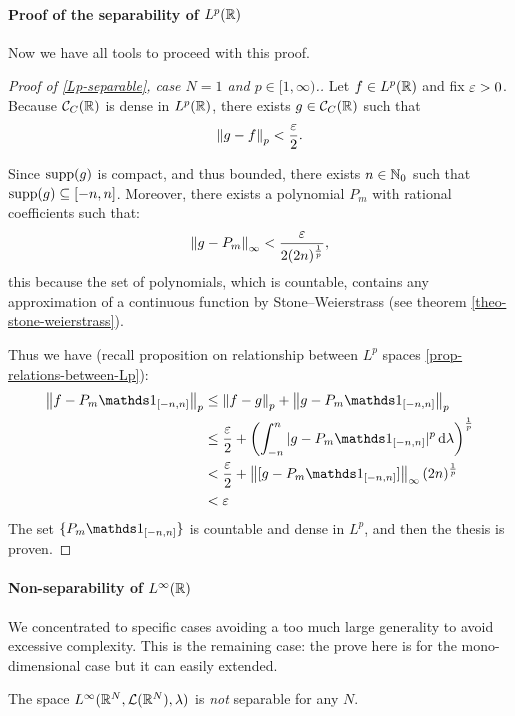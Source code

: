 \paragraph{Proof of the separability of $L^p(\mathbb R)$} Now we have all tools to proceed with this proof.
\begin{proof}[Proof of \vref{Lp-separable}, case $N=1$ and $p \in [1,\infty)$.]
	Let $f\in L^p(\mathbb R)$ and fix $\varepsilon >0$. Because $\mathcal C_C(\mathbb R)$ is dense in $L^p(\mathbb R)$, there exists $g \in \mathcal C_C(\mathbb R)$ such that $$\left\lVert g-f\right\rVert_p < \frac{\varepsilon}{2}.$$
	
	Since $\operatorname*{supp}(g)$ is compact, and thus bounded, there exists $n \in \mathbb N_0$ such that $\operatorname*{supp}(g) \subseteq [-n,n]$. Moreover, there exists a polynomial $P_m$ with rational coefficients such that:
	$$
		\left\lVert g-P_m\right\rVert_\infty 
		< \frac{\varepsilon}{2(2n)^{\frac 1 p}}
	,
	$$
	this because the set of polynomials, which is countable, contains any approximation of a continuous function by Stone--Weierstrass (see theorem \vref{theo-stone-weierstrass}).
	
	Thus we have (recall proposition on relationship between $L^p$ spaces \vref{prop-relations-between-Lp}):
	\begin{align*}
	\norm{f - P_m\Ind_{[-n,n]}}_p &\leq \norm{f-g}_p+\norm{g - P_m\Ind_{[-n,n]}}_p\\
	&\le \frac \eps 2 + \left( \int_{-n}^{n}| g - P_m\Ind_{[-n,n]}|^p \,\dlam \right)^\frac{1}{p}\\
	&< \frac \eps 2 + \norm{[g- P_m\Ind_{[-n,n]}]}_\infty(2n)^{\frac 1 p}\\
	&< \eps
	\end{align*}
	The set $\{P_m\Ind_{[-n,n]}\}$ is countable and dense in $L^p$, and then the thesis is proven.
\end{proof}

\paragraph{Non-separability of $L^\infty(\mathbb R)$} We concentrated to specific cases avoiding a too much large generality to avoid excessive complexity. This is the remaining case: the prove here is for the mono-dimensional case but it can easily extended.

\begin{theo}
	The space $L^\infty(\mathbb R^N, \mathcal L(\mathbb R^N), \lambda)$ is \textit{not} separable for any $N$.
\end{theo}


